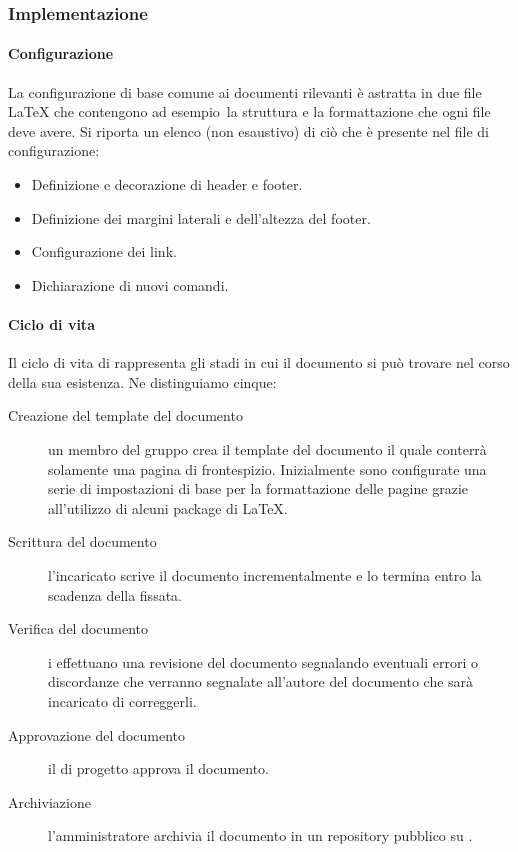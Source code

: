 \documentclass[../norme-di-progetto.tex]{subfiles}
\begin{document}
\subsubsection{Implementazione}%
\label{subs:implementazione}

\paragraph{Configurazione}%
\label{par:configurazione}
La configurazione di base comune ai documenti rilevanti è astratta in due file \LaTeX{} che contengono ad esempio\ la struttura e la formattazione che ogni file deve avere.
Si riporta un elenco (non esaustivo) di ciò che è presente nel file di configurazione:

\begin{itemize}
  \item Definizione e decorazione di header e footer.
  \item Definizione dei margini laterali e dell'altezza del footer.
  \item Configurazione dei link.
  \item Dichiarazione di nuovi comandi.
\end{itemize}

\paragraph{Ciclo di vita}%
\label{par:ciclo_di_vita}
Il ciclo di vita di rappresenta gli stadi in cui il documento si può trovare nel corso della sua esistenza. Ne distinguiamo cinque:

\begin{description}
  \item [Creazione del template del documento] un membro del gruppo crea il template del documento il quale conterrà solamente una pagina di frontespizio. Inizialmente sono configurate una serie di impostazioni di base per la formattazione delle pagine grazie all'utilizzo di alcuni package di \LaTeX.
  \item [Scrittura del documento] l'incaricato scrive il documento incrementalmente e lo termina entro la scadenza della  fissata.
  \item [Verifica del documento] i  effettuano una revisione del documento segnalando eventuali errori o discordanze che verranno segnalate all'autore del documento che sarà incaricato di correggerli.
  \item [Approvazione del documento] il  di progetto approva il documento.
  \item [Archiviazione] l'amministratore archivia il documento in un repository pubblico su .
\end{description}
\end{document}
